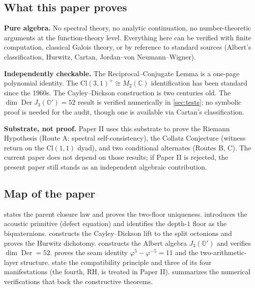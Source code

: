 \documentclass[11pt,a4paper]{article}
\theoremstyle{plain}
\theoremstyle{definition}
\theoremstyle{remark}
\numberwithin{equation}{section}
\providecommand{\Cl}{\mathrm{Cl}}
\providecommand{\C}{\mathbb{C}}
\providecommand{\Os}{\mathbb{O}'}
\providecommand{\vp}{\varphi}
\DeclareMathOperator{\Der}{Der}
\begin{document}
\subsection*{What this paper proves}

\textbf{Pure algebra.}  No spectral theory, no analytic
continuation, no number-theoretic arguments at the function-theory
level.  Everything here can be verified with finite computation,
classical Galois theory, or by reference to standard sources
(Albert's classification, Hurwitz, Cartan, Jordan--von
Neumann--Wigner).

\textbf{Independently checkable.}  The Reciprocal--Conjugate Lemma
is a one-page polynomial identity.  The $\Cl(3,1)^+ \cong M_2(\C)$
identification has been standard since the 1960s.  The
Cayley--Dickson construction is two centuries old.  The
$\dim\Der J_3(\Os) = 52$ result is verified numerically in
\cref{sec:tests}; no symbolic proof is needed for the audit, though
one is available via Cartan's classification.

\textbf{Substrate, not proof.}  Paper II uses this substrate to
prove the Riemann Hypothesis (Route A: spectral self-consistency),
the Collatz Conjecture (witness return on the $\Cl(1,1)$ dyad), and
two conditional alternates (Routes B, C).  The current paper does
not depend on those results; if Paper II is rejected, the present
paper still stands as an independent algebraic contribution.

\subsection*{Map of the paper}

 states the parent closure law and proves
the two-floor uniqueness.   introduces the
acoustic primitive (defect equation) and identifies the depth-$1$
floor as the biquaternions.   constructs the
Cayley--Dickson lift to the split octonions and proves the
Hurwitz dichotomy.   constructs the Albert
algebra $J_3(\Os)$ and verifies $\dim\Der = 52$.  
proves the seam identity $\vp^5 - \vp^{-5} = 11$ and the
two-arithmetic-layer structure.  
state the compatibility principle and three of its four
manifestations (the fourth, RH, is treated in Paper II).
 summarizes the numerical verifications that back
the constructive theorems.

\end{document}

